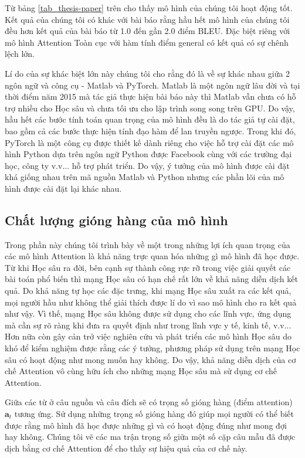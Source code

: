 Từ bảng \ref{tab_thesis-paper} trên cho thấy mô hình của chúng tôi hoạt động tốt. Kết quả của chúng tôi có khác với bài báo rằng hầu hết mô hình của chúng tôi đều hơn kết quả của bài báo từ 1.0 đến gần 2.0 điểm BLEU. Đặc biệt riêng với mô hình Attention Toàn cục với hàm tính điểm general có kết quả có sự chênh lệch lớn.

Lí do của sự khác biệt lớn này chúng tôi cho rằng đó là về sự khác nhau giữa 2 ngôn ngữ và công cụ - Matlab và PyTorch. Matlab là một ngôn ngữ lâu đời và tại thời điểm năm 2015 mà tác giả thực hiện bài báo này thì Matlab vẫn chưa có hỗ trợ nhiều cho Học sâu và chưa tối ưu cho lập trình song song trên GPU. Do vậy, hầu hết các bước tính toán quan trọng của mô hình đều là do tác giả tự cài đặt, bao gồm cả các bước thực hiện tính đạo hàm để lan truyền ngược. Trong khi đó, PyTorch là một công cụ được thiết kế dành riêng cho việc hỗ trợ cài đặt các mô hình Python dựa trên ngôn ngữ Python được Facebook cùng với các trường đại học, công ty v.v... hỗ trợ phát triển. Do vậy, ý tưởng của mô hình được cài đặt khá giống nhau trên mã nguồn Matlab và Python nhưng các phần lõi của mô hình được cài đặt lại khác nhau.

\subsection{Chất lượng gióng hàng của mô hình}
Trong phần này chúng tôi trình bày về một trong những lợi ích quan trọng của các mô hình Attention là khả năng trực quan hóa những gì mô hình đã học được. Từ khi Học sâu ra đời, bên cạnh sự thành công rực rỡ trong việc giải quyết các bài toán phổ biến thì mạng Học sâu có hạn chế rất lớn về khả năng diễn dịch kết quả. Do khả năng tự học các đặc trưng, khi mạng Học sâu xuất ra các kết quả, mọi người hầu như không thể giải thích được lí do vì sao mô hình cho ra kết quả như vậy. Vì thế, mạng Học sâu không được sử dụng cho các lĩnh vực, ứng dụng mà cần sự rõ ràng khi đưa ra quyết định như trong lĩnh vực y tế, kinh tế, v.v... Hơn nữa còn gây cản trở việc nghiên cứu và phát triển các mô hình Học sâu do khó để kiểm nghiệm được rằng các ý tưởng, phương pháp sử dụng trên mạng Học sâu có hoạt động như mong muốn hay không. Do vậy, khả năng diễn dịch của cơ chế Attention vô cùng hữu ích cho những mạng Học sâu mà sử dụng cơ chế Attention.

Giữa các từ ở câu nguồn và câu đích sẽ có trọng số gióng hàng (điểm attention) $\bm{a}_t$ tương ứng. Sử dụng những trọng số gióng hàng đó giúp mọi người có thể biết được rằng mô hình đã học được những gì và có hoạt động đúng như mong đợi hay không. Chúng tôi vẽ các ma trận trọng số giữa một số cặp câu mẫu đã được dịch bằng cơ chế Attention để cho thấy sự hiệu quả của cơ chế này.

